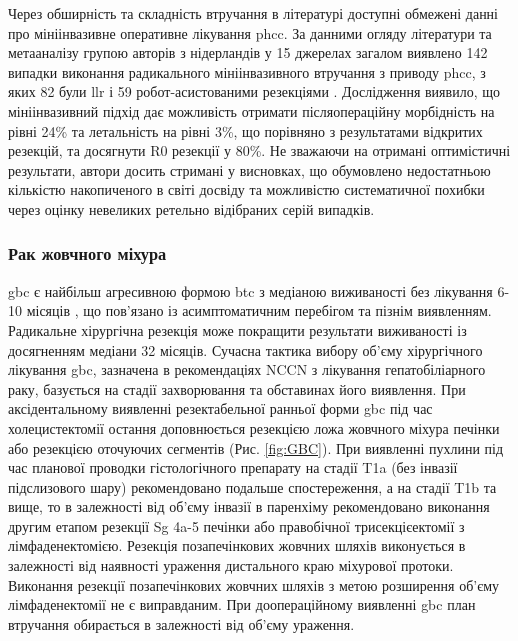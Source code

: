 Через обширність та складність втручання в літературі доступні обмежені данні про мініінвазивне оперативне лікування \acrshort{phcc}. За данними огляду літератури та метааналізу групою авторів з нідерландів у 15 джерелах загалом виявлено 142 випадки виконання радикального мініінвазивного втручання з приводу \acrshort{phcc}, з яких 82 були \acrshort{llr} і 59 робот-асистованими резекціями \cite{Mizuno2019}. Дослідження виявило, що мініінвазивний підхід дає можливість отримати післяопераційну морбідність на рівні 24\% та летальність на рівні 3\%, що порівняно з результатами відкритих резекцій, та досягнути R0 резекції у 80\%. Не зважаючи на отримані оптимістичні результати, автори досить стримані у висновках, що обумовлено недостатньою кількістю накопиченого в світі досвіду та можливістю систематичної похибки через оцінку невеликих ретельно відібраних серій випадків. 

\subsubsection{Рак жовчного міхура}

\acrshort{gbc} є найбільш агресивною формою \acrshort{btc} з медіаною виживаності без лікування 6-10 місяців \cite{Lindner2018}, що пов'язано із асимптоматичним перебігом та пізнім виявленням. Радикальне хірургічна резекція може покращити результати виживаності із досягненням медіани 32 місяців. Сучасна тактика вибору об'єму хірургічного лікування \acrshort{gbc}, зазначена в рекомендаціях \acrshort{NCCN} з лікування гепатобіліарного раку, базується на стадії захворювання та обставинах його виявлення. При аксідентальному виявленні резектабельної ранньої форми \acrshort{gbc} під час холецистектомії остання доповнюється резекцією ложа жовчного міхура печінки або резекцією оточуючих сегментів (Рис. \ref{fig:GBC}). При виявленні пухлини під час планової проводки гістологічного препарату на стадії T1a (без інвазії підслизового шару) рекомендовано подальше спостереження, а на стадії T1b та вище, то в залежності від об'єму інвазії в паренхіму рекомендовано виконання другим етапом резекції Sg 4a-5 печінки або правобічної трисекцієектомії з лімфаденектомією. Резекція позапечінкових жовчних шляхів виконується в залежності від наявності ураження дистального краю міхурової протоки. Виконання резекції позапечінкових жовчних шляхів з метою розширення об'єму лімфаденектомії не є виправданим.  При доопераційному виявленні \acrshort{gbc} план втручання обирається в залежності від об'єму ураження.

